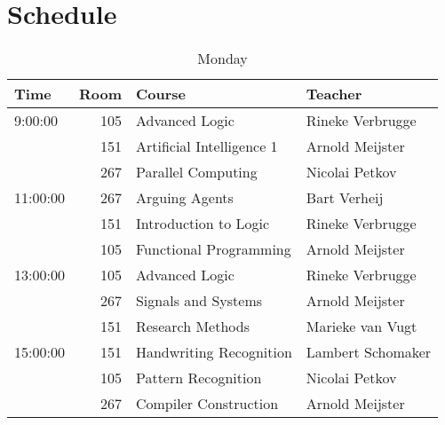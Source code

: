 \section{Schedule}
\label{app:schedule}

\begin{table}[h]
    \centering
    \caption{Monday}
    \begin{tabular}{l|r|l|l}
        Time & Room & Course & Teacher \\ \hline
        \hline
        9:00:00 & 105 & Advanced Logic & Rineke Verbrugge\\
        & 151 & Artificial Intelligence 1 & Arnold Meijster\\
        & 267 & Parallel Computing & Nicolai Petkov\\\hline
        11:00:00 & 267 & Arguing Agents & Bart Verheij\\
        & 151 & Introduction to Logic & Rineke Verbrugge\\
        & 105 & Functional Programming & Arnold Meijster\\\hline
        13:00:00 & 105 & Advanced Logic & Rineke Verbrugge\\
        & 267 & Signals and Systems & Arnold Meijster\\
        & 151 & Research Methods & Marieke van Vugt\\\hline
        15:00:00 & 151 & Handwriting Recognition & Lambert Schomaker\\
        & 105 & Pattern Recognition & Nicolai Petkov\\
        & 267 & Compiler Construction & Arnold Meijster\\
    \end{tabular}
\end{table}

